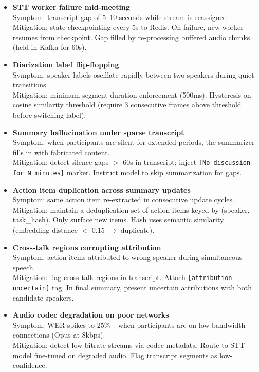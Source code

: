 \begin{itemize}
  \item \textbf{STT worker failure mid-meeting}\\
    Symptom: transcript gap of 5--10 seconds while stream is reassigned.\\
    Mitigation: state checkpointing every 5s to Redis. On failure, new worker resumes from checkpoint. Gap filled by re-processing buffered audio chunks (held in Kafka for 60s).

  \item \textbf{Diarization label flip-flopping}\\
    Symptom: speaker labels oscillate rapidly between two speakers during quiet transitions.\\
    Mitigation: minimum segment duration enforcement (500ms). Hysteresis on cosine similarity threshold (require 3 consecutive frames above threshold before switching label).

  \item \textbf{Summary hallucination under sparse transcript}\\
    Symptom: when participants are silent for extended periods, the summarizer fills in with fabricated content.\\
    Mitigation: detect silence gaps $>$ 60s in transcript; inject \texttt{[No discussion for N minutes]} marker. Instruct model to skip summarization for gaps.

  \item \textbf{Action item duplication across summary updates}\\
    Symptom: same action item re-extracted in consecutive update cycles.\\
    Mitigation: maintain a deduplication set of action items keyed by (speaker, task\_hash). Only surface new items. Hash uses semantic similarity (embedding distance $<$ 0.15 $\rightarrow$ duplicate).

  \item \textbf{Cross-talk regions corrupting attribution}\\
    Symptom: action items attributed to wrong speaker during simultaneous speech.\\
    Mitigation: flag cross-talk regions in transcript. Attach \texttt{[attribution uncertain]} tag. In final summary, present uncertain attributions with both candidate speakers.

  \item \textbf{Audio codec degradation on poor networks}\\
    Symptom: WER spikes to 25\%+ when participants are on low-bandwidth connections (Opus at 8kbps).\\
    Mitigation: detect low-bitrate streams via codec metadata. Route to STT model fine-tuned on degraded audio. Flag transcript segments as low-confidence.
\end{itemize}

